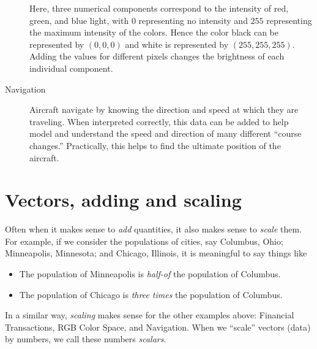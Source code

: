 \documentclass{ximera}
\begin{document}
\begin{concept}
\begin{description}
\begin{center}
  \end{center}
  Here, three numerical components correspond to the intensity of red,
  green, and blue light, with $0$ representing no intensity and $255$
  representing the maximum intensity of the colors. Hence the color
  black can be represented by $(0,0,0)$ and white is represented by
  $(255,255,255)$.  Adding the values for different pixels changes the
  brightness of each individual component.
\item[Navigation] Aircraft navigate by knowing the direction and speed
  at which they are traveling. When interpreted correctly, this data
  can be added to help model and understand the speed and direction of
  many different ``course changes.'' Practically, this helps to find
  the ultimate position of the aircraft.
\end{description}
\end{concept}



\section{Vectors, adding and scaling}


Often when it makes sense to \textit{add} quantities, it also makes
sense to \textit{scale} them. For example, if we consider the
populations of cities, say Columbus, Ohio; Minneapolis, Minnesota; and
Chicago, Illinois, it is meaningful to say things like
\begin{itemize}
\item The population of Minneapolis is \textit{half-of} the population of Columbus.
\item The population of Chicago is \textit{three times} the population of Columbus.
\end{itemize}
In a similar way, \textit{scaling} makes sense for the other examples
above: Financial Transactions, RGB Color Space, and Navigation. When
we ``scale'' vectors (data) by numbers, we call these numbers
\textit{scalars}.
\end{document}
